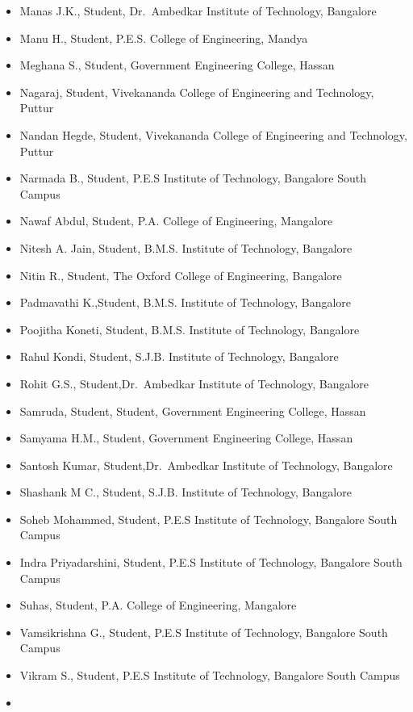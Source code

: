 \begin{itemize}
\item
  Manas J.K., Student, Dr.~Ambedkar Institute of Technology, Bangalore
\item
  Manu H., Student, P.E.S. College of Engineering, Mandya
\item
  Meghana S., Student, Government Engineering College, Hassan
\item
  Nagaraj, Student, Vivekananda College of Engineering and Technology,
  Puttur
\item
  Nandan Hegde, Student, Vivekananda College of Engineering and
  Technology, Puttur
\item
  Narmada B., Student, P.E.S Institute of Technology, Bangalore South
  Campus
\item
  Nawaf Abdul, Student, P.A. College of Engineering, Mangalore
\item
  Nitesh A. Jain, Student, B.M.S. Institute of Technology, Bangalore
\item
  Nitin R., Student, The Oxford College of Engineering, Bangalore
\item
  Padmavathi K.,Student, B.M.S. Institute of Technology, Bangalore
\item
  Poojitha Koneti, Student, B.M.S. Institute of Technology, Bangalore
\item
  Rahul Kondi, Student, S.J.B. Institute of Technology, Bangalore
\item
  Rohit G.S., Student,Dr.~Ambedkar Institute of Technology, Bangalore
\item
  Samruda, Student, Student, Government Engineering College, Hassan
\item
  Samyama H.M., Student, Government Engineering College, Hassan
\item
  Santosh Kumar, Student,Dr.~Ambedkar Institute of Technology, Bangalore
\item
  Shashank M C., Student, S.J.B. Institute of Technology, Bangalore
\item
  Soheb Mohammed, Student, P.E.S Institute of Technology, Bangalore
  South Campus
\item
  Indra Priyadarshini, Student, P.E.S Institute of Technology, Bangalore
  South Campus
\item
  Suhas, Student, P.A. College of Engineering, Mangalore
\item
  Vamsikrishna G., Student, P.E.S Institute of Technology, Bangalore
  South Campus
\item
  Vikram S., Student, P.E.S Institute of Technology, Bangalore South
  Campus
\item

\end{itemize}
